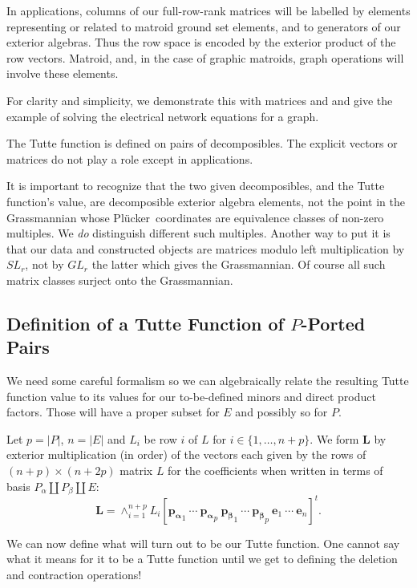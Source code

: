 \documentclass[Unicode]{cedram-alco}
\newcommand{\ext}[1]{\ensuremath{\mathbf{#1}}}
\newcommand{\Plucker}{Pl\"{u}cker\ }
\newcommand{\dunion}{\coprod}
\begin{document}
\noindent
In applications, columns of our full-row-rank matrices will be labelled by elements representing
or related to matroid ground set elements, and to generators of our exterior algebras.
Thus the row space is encoded by the exterior product of the row vectors. Matroid, and,
in the case of graphic matroids, graph operations will involve these elements.   

For clarity and simplicity, we demonstrate this with matrices and
and give the example of solving the electrical network equations for a graph.

The Tutte function is defined
on pairs of decomposibles.
The explicit vectors
or matrices do not play a role except in applications.

It is important to recognize that the two given decomposibles, and the Tutte function's
value, are decomposible exterior algebra elements,
not the point in the Grassmannian
whose \Plucker coordinates are equivalence classes of non-zero multiples.
We \emph{do} distinguish different such multiples.  Another way
to put it is that our data and constructed objects are matrices modulo left multiplication
by $SL_r$, not by $GL_r$ the latter which gives the Grassmannian.
Of course all such matrix classes surject onto the Grassmannian.




\subsection{Definition of a Tutte Function of $P$-Ported Pairs}


We need 
some careful formalism so we can algebraically relate the resulting Tutte function value
to its values for our to-be-defined minors and direct product factors.  Those 
will have a proper subset for $E$ and possibly so for $P$.


Let $p = |P|$, $n=|E|$ and $L_i$ be row $i$ of $L$ for $i\in\{1,\ldots,n+p\}$.
We form $\ext{L}$ by exterior multiplication (in order) of the vectors each given by the
rows of $(n+p)\times (n+2p)$ matrix $L$ for the coefficients when written in terms of
basis $P_\alpha \dunion P_\beta \dunion E$:
\begin{equation}\label{defExtL}
  \ext{L} = \wedge_{i=1}^{n+p}L_i
      [\ext{p_\alpha}_1\ \cdots\ \ext{p_\alpha}_{p}\ \ext{p_\beta}_1\ \cdots\ \ext{p_\beta}_{p}\
      \ext{e}_1\ \cdots\ \ext{e}_{n}]^t. 
\end{equation}

We can now define what will turn out to be our Tutte function.  One cannot say what it means for
it to be a Tutte function until we get to defining the deletion and contraction operations!
\end{document}
